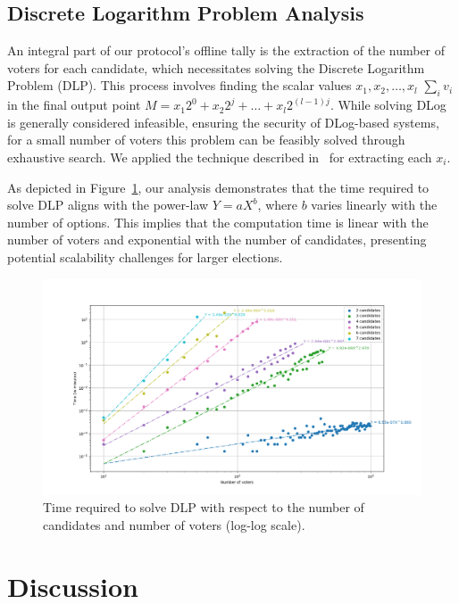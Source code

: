 \documentclass[runningheads]{llncs}
\begin{document}
\subsection{Discrete Logarithm Problem Analysis}

An integral part of our protocol's offline tally is the extraction of the number of voters for each candidate, which necessitates solving the Discrete Logarithm Problem (DLP). This process involves finding the scalar values $x_1, x_2, \dots, x_l$ $\sum_i v_i$ in the final output point $M = x_1 2^0 + x_2 2^j + \dots + x_l 2^{(l-1)j}$. While solving DLog is generally considered infeasible, ensuring the security of DLog-based systems, for a small number of voters this problem can be feasibly solved through exhaustive search. We applied the technique described in~\cite{haoAnonymousVotingTworound2010} for extracting each $x_i$. 

As depicted in Figure~\ref{fig:dlog-search}, our analysis demonstrates that the time required to solve DLP aligns with the power-law \( Y = aX^b \), where \( b \) varies linearly with the number of options. This implies that the computation time is linear with the number of voters and exponential with the number of candidates, presenting potential scalability challenges for larger elections.

\begin{figure}[H]
    \centering
    \includegraphics[width=\textwidth]{dlog-search-time.png}
    \caption{Time required to solve DLP with respect to the number of candidates and number of voters (log-log scale).}
    \label{fig:dlog-search}
\end{figure}



\section{Discussion}
\end{document}
